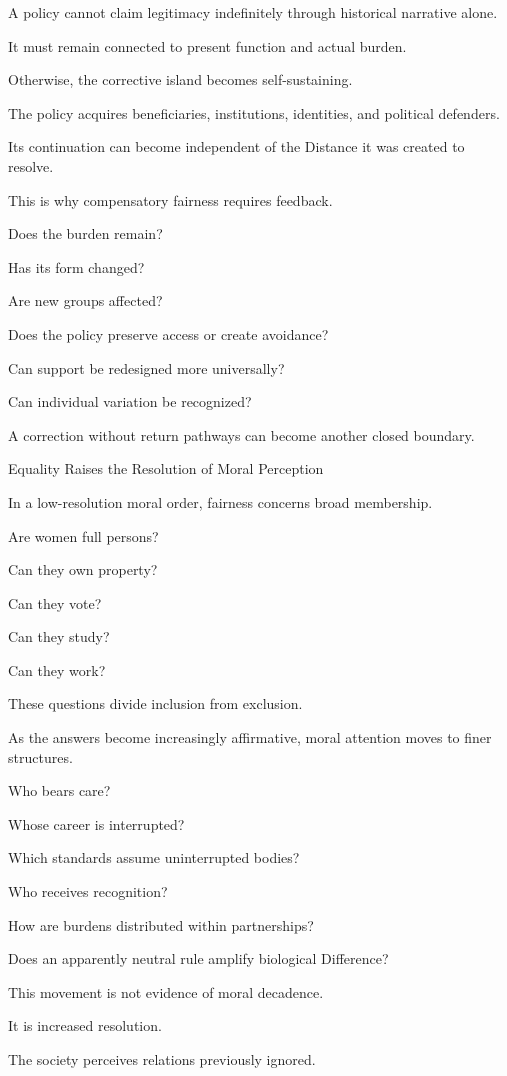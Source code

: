 A policy cannot claim legitimacy indefinitely through historical narrative alone.

It must remain connected to present function and actual burden.

Otherwise, the corrective island becomes self-sustaining.

The policy acquires beneficiaries, institutions, identities, and political defenders.

Its continuation can become independent of the Distance it was created to resolve.

This is why compensatory fairness requires feedback.

Does the burden remain?

Has its form changed?

Are new groups affected?

Does the policy preserve access or create avoidance?

Can support be redesigned more universally?

Can individual variation be recognized?

A correction without return pathways can become another closed boundary.

Equality Raises the Resolution of Moral Perception

In a low-resolution moral order, fairness concerns broad membership.

Are women full persons?

Can they own property?

Can they vote?

Can they study?

Can they work?

These questions divide inclusion from exclusion.

As the answers become increasingly affirmative, moral attention moves to finer structures.

Who bears care?

Whose career is interrupted?

Which standards assume uninterrupted bodies?

Who receives recognition?

How are burdens distributed within partnerships?

Does an apparently neutral rule amplify biological Difference?

This movement is not evidence of moral decadence.

It is increased resolution.

The society perceives relations previously ignored.

